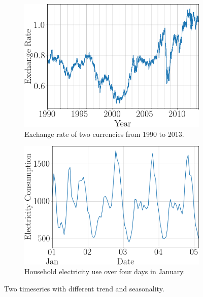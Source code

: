 \begin{figure}[htb]
  \centering
  \begin{subfigure}{0.47\textwidth}
    \includegraphics[width=\linewidth]{./img/exchange_rate_zoomed_2_mod.png}
    \caption{Exchange rate of two currencies from 1990 to 2013.}
    \label{fig:example_timeseries}
  \end{subfigure}
  \hfill
  \begin{subfigure}{0.47\textwidth}
    \includegraphics[width=\linewidth]{./img/electricity_zoomed_3_mod.png}
    \caption{Household electricity use over four days in January.}
    \label{fig:example_timeseries_electricity}
  \end{subfigure}
  \hfill
  \caption{Two timeseries with different trend and seasonality.}
\end{figure}

